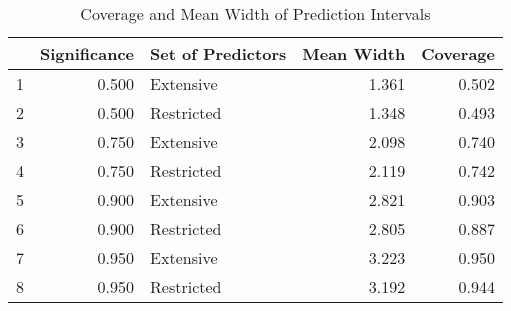 \begin{table}[ht]
\centering
\begin{tabular}{rrlrr}
  \toprule
 & Significance & Set of Predictors & Mean Width & Coverage \\ 
  \midrule
1 & 0.500 & Extensive & 1.361 & 0.502 \\ 
  2 & 0.500 & Restricted & 1.348 & 0.493 \\ 
  3 & 0.750 & Extensive & 2.098 & 0.740 \\ 
  4 & 0.750 & Restricted & 2.119 & 0.742 \\ 
  5 & 0.900 & Extensive & 2.821 & 0.903 \\ 
  6 & 0.900 & Restricted & 2.805 & 0.887 \\ 
  7 & 0.950 & Extensive & 3.223 & 0.950 \\ 
  8 & 0.950 & Restricted & 3.192 & 0.944 \\ 
   \bottomrule
\end{tabular}
\caption{Coverage and Mean Width of Prediction Intervals} 
\end{table}
